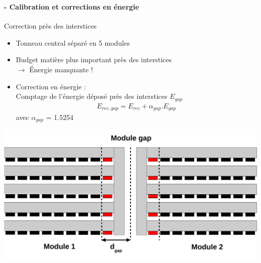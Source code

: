 \documentclass[8pt]{beamer}
\begin{document}
  \begin{frame}
  \frametitle{\secname}
  \framesubtitle{\subsecname - Calibration et corrections en énergie}
    \begin{minipage}{0.49\linewidth}
      \begin{block}{Correction près des interstices}
        \begin{itemize}
          \item Tonneau central séparé en 5 modules
          \item Budget matière plus important près des interstices \\
          $\rightarrow$ Énergie manquante !
          \item Correction en énergie :\\
          Comptage de l'énergie déposé près des interstices $E_{gap}$
          \begin{align*}
            E_{rec,gap} = E_{rec} + \alpha_{gap}.E_{gap}
          \end{align*}
          avec $\alpha_{gap}$ = 1.5254
        \end{itemize}
      \end{block}
      \begin{center}
        \includegraphics[width=\linewidth]{ModuleGap.pdf}
      \end{center}
    \end{minipage} \hfill
    \begin{minipage}{0.5\linewidth}
      \begin{center}
        \begin{overprint}

\end{overprint}
\end{center}
\end{minipage}
\end{frame}
\end{document}
